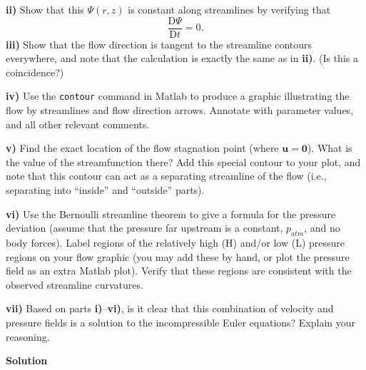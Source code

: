 \documentclass{article}
\def\*#1{\mathbf{#1}}
\newcommand{\dadvd}[2]{\dfrac{\text{D} #1}{\text{D} #2}} %
\begin{document}
\textbf{ii)} Show that this $\Psi(r, z)$ is constant along streamlines
by verifying that
%
\begin{equation*}
    \dadvd{\Psi}{t} = 0
    .
\end{equation*}
%
\textbf{iii)} Show that the flow direction is tangent to the streamline
contours everywhere, and note that the calculation is exactly the same
as in \textbf{ii)}. (Is this a coincidence?)

\textbf{iv)} Use the \texttt{contour} command in Matlab to produce a
graphic illustrating the flow by streamlines and flow direction arrows.
Annotate with parameter values, and all other relevant comments.

\textbf{v)} Find the exact location of the flow stagnation point (where
$\*u = \*0$). What is the value of the streamfunction there? Add this
special contour to your plot, and note that this contour can act as a
separating streamline of the flow (i.e., separating into ``inside'' and
``outside'' parts).

\textbf{vi)} Use the Bernoulli streamline theorem to give a formula for
the pressure deviation (assume that the pressure far upstream is a
constant, $p_{atm}$, and no body forces). Label regions of the
relatively high (H) and/or low (L) pressure regions on your flow graphic
(you may add these by hand, or plot the pressure field as an extra
Matlab plot). Verify that these regions are consistent with the observed
streamline curvatures.

\textbf{vii)} Based on parts \textbf{i)}--\textbf{vi)}, is it clear that
this combination of velocity and pressure fields is a solution to the
incompressible Euler equations? Explain your reasoning.

\newpage

\textbf{Solution}
\end{document}
